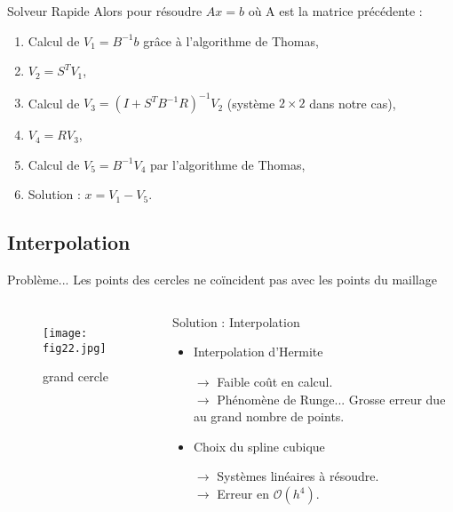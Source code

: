 \documentclass[11pt]{beamer}
\begin{document}
\begin{frame}{Solveur Rapide}
Alors pour résoudre $Ax=b$ où A est la matrice précédente :

\begin{enumerate}
\item Calcul de $V_1=B^{-1}b$ grâce à l'algorithme de Thomas,

\item $V_2 = S^T V_1$,

\item Calcul de $V_3 = \left( I + S^T B^{-1} R \right)^{-1} V_2$ (système $2 \times 2$ dans notre cas),

\item $V_4 = R V_3$,

\item Calcul de $V_5 = B^{-1} V_4$ par l'algorithme de Thomas,

\item Solution : $x = V_1 - V_5$.
\end{enumerate}
\end{frame}


\subsection{Interpolation}
\begin{frame}

  \begin{alertblock}{Problème...}
  Les points des cercles ne coïncident pas avec les points du maillage  
  \end{alertblock}
  
\begin{columns}

\begin{figure}
\begin{center}
\texttt{[image: fig22.jpg]}
\end{center}
\caption{grand cercle}
\end{figure}

\pause
{}

\begin{exampleblock}{Solution : Interpolation}
  \begin{itemize}
  \item Interpolation d'Hermite

    $\rightarrow$ Faible coût en calcul. \\
    $\rightarrow$ Phénomène de Runge... Grosse erreur due au grand nombre de points.

  \item Choix du spline cubique

    $\rightarrow$ Systèmes linéaires à résoudre.\\
    $\rightarrow$ Erreur en $\mathcal{O}\left( h^4 \right)$.
  \end{itemize}
\end{exampleblock}
\end{columns}
\end{frame}
\end{document}
